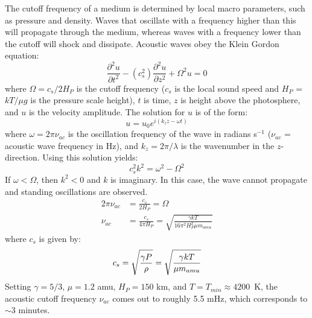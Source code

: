 The cutoff frequency of a medium is determined by local macro parameters,
such as pressure and density. Waves that oscillate with a frequency higher
than this will propagate through the medium, whereas waves with a frequency
lower than the cutoff will shock and dissipate. Acoustic waves obey the
Klein Gordon equation:
\begin{equation}
    \frac{\partial^{2}u}{\partial t^{2}} - \left( c_{s}^{2} \right)
    \frac{\partial^{2}u}{\partial z^{2}} + \Omega^{2}u = 0
\end{equation}
where $\Omega = c_{s}/2H_{P}$ is the cutoff frequency
($c_{s}$ is the local sound speed and
$H_{P}$ = $ kT / \mu g $ is the pressure scale height),
$t$ is time, $z$ is height
above the photosphere, and $u$ is the velocity amplitude.
The solution for $u$ is of the form:
\begin{equation}
    u = u_{0}e^{i\left( k_{z}z - \omega t \right)}
\end{equation}
where $\omega = 2 \pi \nu_{ac}$ is the oscillation frequency of the wave
in radians s$^{-1}$ ($\nu_{ac}$ = acoustic wave frequency in Hz),
and $k_{z} = 2\pi/\lambda$
is the wavenumber in the $z$-direction.
Using this solution yields:
\begin{equation}
    c_{s}^{2} k^{2} = \omega^{2} - \Omega^{2}
\end{equation}
If $\omega < \Omega$, then $k^{2} < 0$ and $k$ is imaginary.
In this case, the wave cannot propagate and standing oscillations are
observed.
\begin{align}
    2\pi\nu_{ac} &= \frac{c_{s}}{2H_{P}} = \Omega \\
    \nu_{ac} &= \frac{c_{s}}{4 \pi H_{P}}
    = \sqrt{ \frac{\gamma k T }{ 16 \pi^{2} H_{P}^{2} \mu m_{amu} } }
\end{align}
where $c_{s}$ is given by:
\begin{equation}
    c_{s}
    = \sqrt{ \frac{ \gamma P }{ \rho }}
    = \sqrt{ \frac{ \gamma k T }{ \mu m_{amu} }}\\
\end{equation}
Setting $\gamma = 5/3$, $\mu = 1.2$ amu, $H_{P} = 150$ km,
and $ T = T_{min} \approx 4200$~K,
the acoustic cutoff frequency $\nu_{ac}$ comes out to roughly
5.5 mHz, which corresponds to $\sim$3 minutes.


